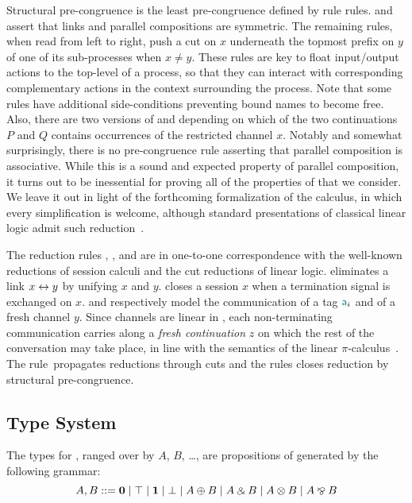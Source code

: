 Structural pre-congruence is the least pre-congruence defined by rule
 rules.
%
\SLink and \SComm assert that links and parallel compositions are symmetric. The
remaining rules, when read from left to right, push a cut on $x$ underneath the
topmost prefix on $y$ of one of its sub-processes when $x \ne y$. These rules
are key to float input/output actions to the top-level of a process, so that
they can interact with corresponding complementary actions in the context
surrounding the process.
%
Note that some rules have additional side-conditions preventing bound names to
become free. Also, there are two
versions of \SForkL and \SForkR depending on which of the two continuations $P$
and $Q$ contains occurrences of the restricted channel $x$.
%
Notably and somewhat surprisingly, there is no pre-congruence rule asserting
that parallel composition is associative. While this is a sound and expected
property of parallel composition, it turns out to be inessential for proving all
of the properties of \Calculus that we consider. We leave it out in light of the
forthcoming formalization of the calculus, in which every simplification is
welcome, although standard presentations of classical linear logic admit such
reduction~\cite{Doumane17}.

The reduction rules \RLink, \RClose, \RSelect and \RFork are in one-to-one
correspondence with the well-known reductions of session calculi and the cut
reductions of linear logic. \RLink eliminates a link $x\leftrightarrow y$ by unifying $x$
and $y$. \RClose closes a session $x$ when a termination signal is exchanged on
$x$. \RSelect and \RFork respectively model the communication of a tag $\mathsf{\color{teal}a}_i$
and of a fresh channel $y$. Since channels are linear in \Calculus, each
non-terminating communication carries along a \emph{fresh continuation} $z$ on
which the rest of the conversation may take place, in line with the semantics of
the linear $\pi$-calculus~\cite{KobayashiPierceTurner99}.
%
The rule~\RCut propagates reductions through cuts and the rules \RCong closes
reduction by structural pre-congruence.

\subsection{Type System}

The types for \Calculus, ranged over by $A$, $B$, \dots, are propositions of
\MALL generated by the following grammar:
\[
    A, B ::= \mathbf{0} \mid \top \mid \mathbf{1} \mid \bot \mid A \mathbin\oplus B \mid A \mathbin\binampersand B \mid A \mathbin\otimes B \mid A \mathbin\bindnasrepma B
\]

